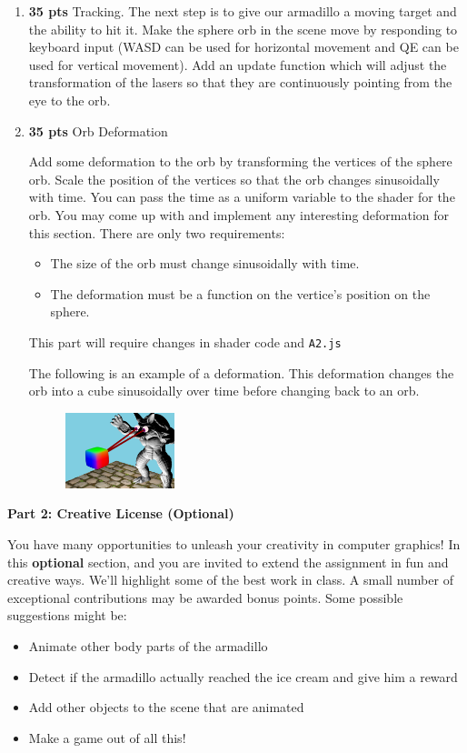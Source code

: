 \documentclass[12pt]{exam}
\begin{document}
\begin{enumerate}
\item {\bf 35 pts} Tracking.
    The next step is to give our armadillo a moving target and the ability to hit it.  Make the sphere orb in the scene move by responding to keyboard input (WASD can be used for horizontal movement and QE can be used for vertical movement). Add an update function which will adjust the transformation of the lasers so that they are continuously pointing from the eye to the orb. 
    


\item {\bf 35 pts} Orb Deformation

 Add some deformation to the orb by transforming the vertices of the sphere orb. Scale the position of the vertices so that the orb changes sinusoidally with time. You can pass the time as a uniform variable to the shader for the orb. You may come up with and implement any interesting deformation for this section. There are only two requirements: 
\begin{itemize}
\item The size of the orb must change sinusoidally with time.
\item The deformation must be a function on the vertice's position on the sphere.
\end{itemize}
 
This part will require changes in shader code and {\tt A2.js}

The following is an example of a deformation. This deformation changes the orb into a cube sinusoidally over time before changing back to an orb.
 
    \begin{figure}[H]
    \centering
    \includegraphics[width=0.3\textwidth]{./last_step.png}
    \end{figure}

  
\end{enumerate}


{\bf Part 2: Creative License (Optional)}

You have many opportunities to unleash your creativity in
computer graphics!  In this \textbf{optional} section, and you are
invited to extend the assignment in fun and creative ways.
We'll highlight some of the best work in class. A small number of
exceptional contributions may be awarded bonus points.
Some possible suggestions might be:
\begin{itemize}
\item Animate other body parts of the armadillo
\item Detect if the armadillo actually reached the ice cream and give him a reward
\item Add other objects to the scene that are animated
\item Make a game out of all this! 
\end{itemize}
\end{document}
